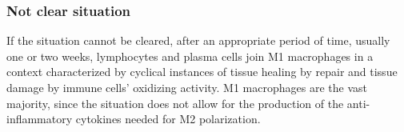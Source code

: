 		\subsubsection{Not clear situation}
		If the situation cannot be cleared, after an appropriate period of time, usually one or two weeks, lymphocytes and plasma cells join M1 macrophages in a context characterized by cyclical instances of tissue healing by repair and tissue damage by immune cells’ oxidizing activity.
		M1 macrophages are the vast majority, since the situation does not allow for the production of the anti-inflammatory cytokines needed for M2 polarization.

